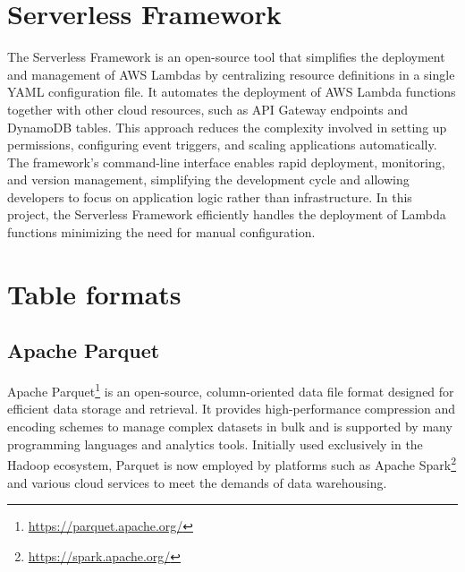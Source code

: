 \section{Serverless Framework}
The Serverless Framework is an open-source tool that simplifies the deployment and management of \ac{AWS} Lambdas by centralizing resource definitions in a single \ac{YAML} configuration file. It automates the deployment of \ac{AWS} Lambda functions together with other cloud resources, such as \ac{API} Gateway endpoints and DynamoDB tables. This approach reduces the complexity involved in setting up permissions, configuring event triggers, and scaling applications automatically. The framework's command-line interface enables rapid deployment, monitoring, and version management, simplifying the development cycle and allowing developers to focus on application logic rather than infrastructure. In this project, the Serverless Framework efficiently handles the deployment of Lambda functions minimizing the need for manual configuration.

\section{Table formats}
\subsection{Apache Parquet}
\label{sec:parquet}
Apache Parquet\footnote{\url{https://parquet.apache.org/}} is an open-source, column-oriented data file format designed for efficient data storage and retrieval. It provides high-performance compression and encoding schemes to manage complex datasets in bulk and is supported by many programming languages and analytics tools. Initially used exclusively in the Hadoop ecosystem, Parquet is now employed by platforms such as Apache Spark\footnote{\url{https://spark.apache.org/}} and various cloud services to meet the demands of data warehousing.

